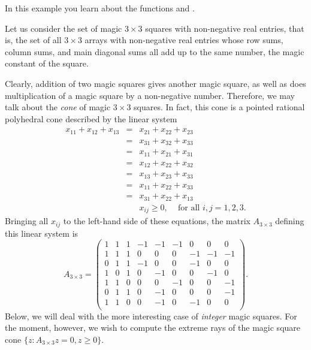 In this example you learn about the functions  and
.

Let us consider the set of magic $3\times 3$ squares with
non-negative real entries, that is, the set of all $3\times 3$
arrays with non-negative real entries whose row sums, column sums,
and main diagonal sums all add up to the same number, the magic
constant of the square. \vspace{-0.3cm}
\begin{center}
  
\end{center}
\vspace{-0.4cm} Clearly, addition of two magic squares gives another
magic square, as well as does multiplication of a magic square by a
non-negative number. Therefore, we may talk about the \emph{cone} of
magic $3\times 3$ squares. In fact, this cone is a pointed rational
polyhedral cone described by the linear system
\begin{eqnarray*}
x_{11}+x_{12}+x_{13}
& = & x_{21}+x_{22}+x_{23}\\
& = & x_{31}+x_{32}+x_{33}\\
& = & x_{11}+x_{21}+x_{31}\\
& = & x_{12}+x_{22}+x_{32}\\
& = & x_{13}+x_{23}+x_{33}\\
& = & x_{11}+x_{22}+x_{33}\\
& = & x_{31}+x_{22}+x_{13}\\
&   & x_{ij} \geq 0,\;\;\; \text{ for all } i,j=1,2,3.
\end{eqnarray*}
Bringing all $x_{ij}$ to the left-hand side of these equations, the
matrix $A_{3\times 3}$ defining this linear system is
\[
A_{3\times 3}=\left(
\begin{array}{rrrrrrrrr}
1 & 1 & 1 & -1 & -1 & -1 &  0 &  0 &  0\\
1 & 1 & 1 &  0 &  0 &  0 & -1 & -1 & -1\\
0 & 1 & 1 & -1 &  0 &  0 & -1 &  0 &  0\\
1 & 0 & 1 &  0 & -1 &  0 &  0 & -1 &  0\\
1 & 1 & 0 &  0 &  0 & -1 &  0 &  0 & -1\\
0 & 1 & 1 &  0 & -1 &  0 &  0 &  0 & -1\\
1 & 1 & 0 &  0 & -1 &  0 & -1 &  0 &  0\\
\end{array}
\right).
\]
Below, we will deal with the more interesting case of \emph{integer} magic
squares. For the moment, however, we wish to compute the extreme rays
of the magic square cone $\{z:A_{3\times 3}z=0,z\geq 0\}$.

